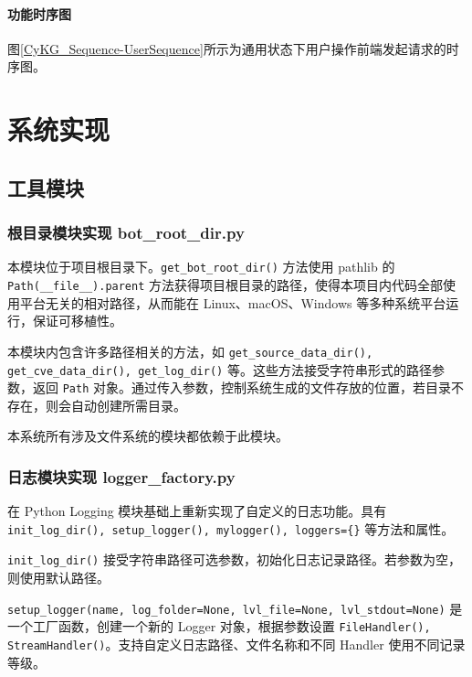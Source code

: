 \documentclass[a4paper,AutoFakeBold,oneside,12pt]{book}
\begin{document}
\subsubsection{功能时序图}

图\ref{CyKG_Sequence-UserSequence}所示为通用状态下用户操作前端发起请求的时序图。


\chapter{系统实现}

\section{工具模块}

\subsection{根目录模块实现 bot{\_}root{\_}dir.py}

本模块位于项目根目录下。\lstinline[style = python]|get_bot_root_dir()| 方法使用 pathlib 的 \lstinline[style = python]|Path(__file__).parent| 方法获得项目根目录的路径，使得本项目内代码全部使用平台无关的相对路径，从而能在 Linux、macOS、Windows 等多种系统平台运行，保证可移植性。

本模块内包含许多路径相关的方法，如 \lstinline|get_source_data_dir(), get_cve_data_dir(), get_log_dir()| 等。这些方法接受字符串形式的路径参数，返回 \lstinline|Path| 对象。通过传入参数，控制系统生成的文件存放的位置，若目录不存在，则会自动创建所需目录。

本系统所有涉及文件系统的模块都依赖于此模块。

\subsection{日志模块实现 logger{\_}factory.py}

在 Python Logging 模块基础上重新实现了自定义的日志功能。具有 \lstinline|init_log_dir(), setup_logger(), mylogger(), loggers={}| 等方法和属性。

\lstinline|init_log_dir()| 接受字符串路径可选参数，初始化日志记录路径。若参数为空，则使用默认路径。

\lstinline|setup_logger(name, log_folder=None, lvl_file=None, lvl_stdout=None)| 是一个工厂函数，创建一个新的 Logger 对象，根据参数设置 \lstinline|FileHandler(), StreamHandler()|。支持自定义日志路径、文件名称和不同 Handler 使用不同记录等级。
\end{document}
